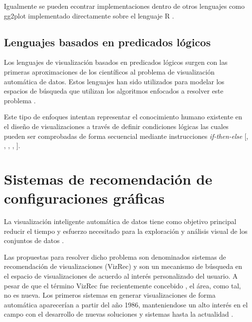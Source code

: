 Igualmente se pueden econtrar implementaciones dentro de otros lenguajes como gg2plot implementado
directamente sobre el lenguaje R \cite{wickham2010layered}.

\subsection{Lenguajes basados en predicados l\'ogicos}

Los lenguajes de visualizaci\'on basados en predicados l\'ogicos surgen
con las primeras aproximaciones de los cient\'ificos al problema de visualizaci\'on autom\'atica de
datos. Estos lenguajes han sido utilizados para modelar los espacios de b\'usqueda que utilizan los algoritmos
enfocados a resolver este problema \cite{godfrey2016interactive}.

Este tipo de enfoques intentan representar el conocimiento humano existente \cite{bertin1983semiology} en el dise\~no
de visualizaciones a trav\'es de definir condiciones l\'ogicas las cuales pueden ser comprobadas de forma
secuencial mediante instrucciones \textit{if-then-else} [\cite*{mackinlay1986automating}, \cite*{mackinlay2007show}, \cite*{roth1994interactive}, \cite*{wongsuphasawat2015voyager}, \cite*{moritz2018draco}].




\section{Sistemas de recomendaci\'on de configuraciones gr\'aficas}

La visualizaci\'on inteligente autom\'atica de datos tiene como objetivo
principal reducir el tiempo y esfuerzo necesitado para la exploraci\'on y
an\'alisis visual de los conjuntos de datos \cite{zeng2021we}. 

Las propuestas para
resolver dicho problema son denominados sistemas de recomendaci\'on de
visualizaciones (VizRec) y son un mecanismo de b\'usqueda en el espacio de visualizaciones
de acuerdo al inter\'es personalizado del usuario. A pesar de que el t\'ermino
VizRec fue recientemente concebido \cite{vartak2017towards}, el \'area, como tal, no es nueva.
Los primeros sistemas en generar visualizaciones de forma autom\'atica aparecer\'ian
a partir del a\~no 1986, manteniendose un alto inter\'es en el campo con el desarrollo
de nuevas soluciones y sistemas hasta la actualidad \cite{godfrey2016interactive}. 

